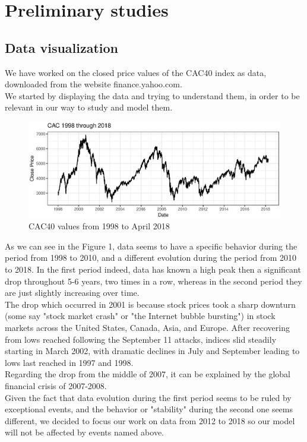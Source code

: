 \label{sec:02Preliminarystudies}
\section{Preliminary studies}

\subsection{Data visualization}
We have worked on the closed price values of the CAC40 index as data, downloaded from the website finance.yahoo.com.\\
We started by displaying the data and trying to understand them, in order to be relevant in our way to study and model them.

\FloatBarrier
\begin{figure}[!htbp]
  \centering
  \includegraphics[width=\textwidth]{img/Plot1.eps}
  \caption{CAC40 values from 1998 to April 2018}
\end{figure}
\FloatBarrier

As we can see in the Figure 1, data seems to have a specific behavior during the period from 1998 to 2010, and a different evolution during the period from 2010 to 2018. In the first period indeed, data has known a high peak then a significant drop throughout 5-6 years, two times in a row, whereas in the second period they are just slightly increasing over time. \\
The drop which occurred in 2001 is because stock prices took a sharp downturn (some say "stock market crash" or "the Internet bubble bursting") in stock markets across the United States, Canada, Asia, and Europe. After recovering from lows reached following the September 11 attacks, indices slid steadily starting in March 2002, with dramatic declines in July and September leading to lows last reached in 1997 and 1998. \\
Regarding the drop from the middle of 2007, it can be explained by the global financial crisis of 2007-2008. \\
Given the fact that data evolution during the first period seems to be ruled by exceptional events, and the behavior or "stability" during the second one seems different, we decided to focus our work on data from 2012 to 2018 so our model will not be affected by events named above.

